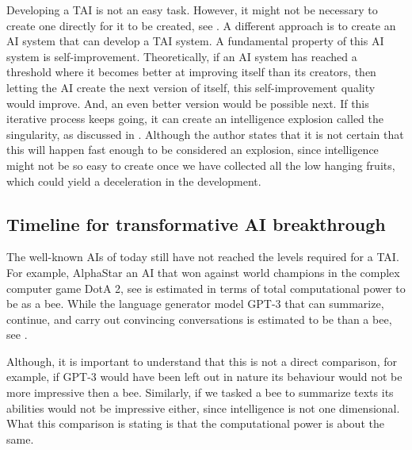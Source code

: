 \documentclass[12pt,A4]{report}
\theoremstyle{definition}
\begin{document}
Developing a TAI is not an easy task. However, it might not be necessary to create one directly for it to be created, see \citet{Bostrom14}. A different approach is to create an AI system that can develop a TAI system. A fundamental property of this AI system is self-improvement. Theoretically, if an AI system has reached a threshold where it becomes better at improving itself than its creators, then letting the AI create the next version of itself, this self-improvement quality would improve. And, an even better version would be possible next. If this iterative process keeps going, it can create an intelligence explosion called the singularity, as discussed in \citet{Yudkowsky13}. Although the author states that it is not certain that this will happen fast enough to be considered an explosion, since intelligence might not be so easy to create once we have collected all the low hanging fruits, which could yield a deceleration in the development. 

\subsection{Timeline for transformative AI breakthrough}
The well-known AIs of today still have not reached the levels required for a TAI. For example, AlphaStar an AI that won against world champions in the complex computer game DotA 2, see \citet{ALphaStar} is estimated in terms of total computational power to be  as a bee. While the language generator model GPT-3 that can summarize, continue, and carry out convincing conversations is estimated to be  than a bee, see \citet{Ajeya}.

Although, it is important to understand that this is not a direct comparison, for example, if GPT-3 would have been left out in nature its behaviour would not be more impressive then a bee. Similarly, if we tasked a bee to summarize texts its abilities would not be impressive either, since intelligence is not one dimensional. What this comparison is stating is that the computational power is about the same. 
\end{document}
